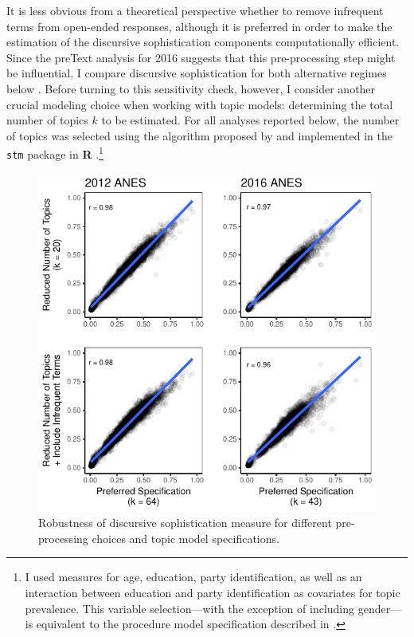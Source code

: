 \documentclass[12pt]{article}
\begin{document}
It is less obvious from a theoretical perspective whether to remove infrequent terms from open-ended responses, although it is preferred in order to make the estimation of the discursive sophistication components computationally efficient. Since the preText analysis for 2016 suggests that this pre-processing step might be influential, I compare discursive sophistication for both alternative regimes below \citep[c.f.,][]{denny2018text}. Before turning to this sensitivity check, however, I consider another crucial modeling choice when working with topic models: determining the total number of topics $k$ to be estimated. For all analyses reported below, the number of topics was selected using the algorithm proposed by \citet{lee2014low} and implemented in the \texttt{stm} package in \textbf{R} \citep{roberts2014stm}.\footnote{I used measures for age, education, party identification, as well as an interaction between education and party identification as covariates for topic prevalence. This variable selection---with the exception of including gender---is equivalent to the procedure model specification described in \citet{roberts2014structural}.} 

\begin{figure}[h]\centering
\includegraphics{../fig/pretext_robustness.pdf}
\caption{Robustness of discursive sophistication measure for different pre-processing choices and topic model specifications.}\label{fig:pretext_robustness}
\end{figure}
\end{document}
